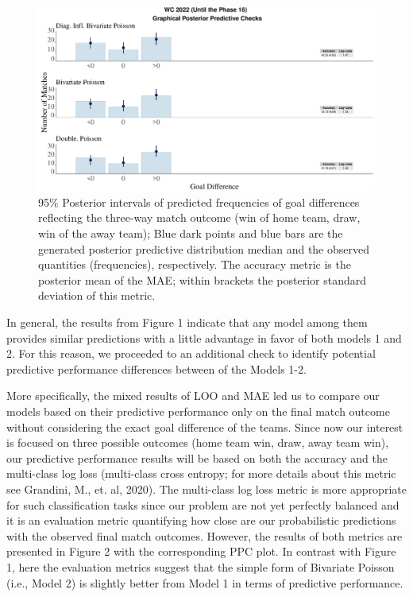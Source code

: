 \documentclass[
  10pt,
]{article}
\begin{document}
\begin{center}
\begin{figure} \includegraphics[width=0.8\linewidth]{WC_2022_Out_Sample_PPC_Classification.pdf}
\caption{95\% Posterior intervals of predicted frequencies of goal differences reflecting the three-way match outcome (win of home team, draw, win of the away team); Blue dark points and blue bars are the generated posterior predictive distribution median and the observed quantities (frequencies), respectively. The accuracy metric is the posterior mean of the MAE; within brackets the posterior standard deviation of this metric.}
\end{figure}
\end{center}



In general, the results from Figure 1 indicate that any model among them provides similar predictions with a little advantage in favor of both models 1 and 2. For this reason, we proceeded to an additional check to identify potential predictive performance differences between of the Models 1-2.  

More specifically, the mixed results of LOO and MAE led us to compare our models based on their predictive performance only on the final match outcome without considering the exact goal difference of the teams. Since now our interest is focused on three possible outcomes (home team win, draw, away team win), our predictive performance results will be based on both the accuracy and the multi-class log loss (multi-class cross entropy; for more details about this metric see Grandini, M., et. al, 2020). The multi-class log loss metric is more appropriate for such classification tasks since our problem are not yet perfectly balanced and it is an evaluation metric quantifying how close are our probabilistic predictions with the observed final match outcomes. However, the results of both metrics are presented in Figure 2 with the corresponding PPC plot. In contrast with Figure 1, here the evaluation metrics suggest that the simple form of Bivariate Poisson (i.e., Model 2) is slightly better from Model 1 in terms of predictive performance.  
\end{document}
